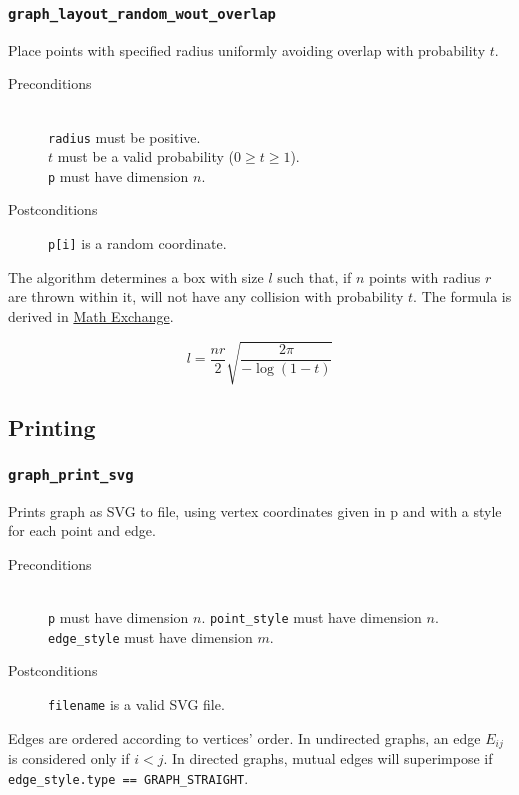 \documentclass[a4paper,10pt]{article}
\begin{document}
\subsubsection{\texttt{graph\_layout\_random\_wout\_overlap}}

Place points with specified radius uniformly avoiding overlap 
with probability $t$.

\begin{description}
 \item[Preconditions]~\\
   \texttt{radius} must be positive.\\
   $t$ must be a valid probability ($0 \ge t \ge 1$).\\
   \texttt{p} must have dimension $n$.
 \item[Postconditions] \texttt{p[i]} is a random coordinate.
\end{description}

The algorithm determines a box with size $l$ such that, if $n$ 
points with radius $r$ are thrown within it, will not have any 
collision with probability $t$. The formula is derived in 
\href{http://math.stackexchange.com/q/325844/37667}{Math Exchange}.

\begin{equation*}
 l = \frac{nr}{2} \sqrt{\frac{2 \pi}{-\log(1-t)}}
\end{equation*}

\subsection{Printing}

\subsubsection{\texttt{graph\_print\_svg}}

Prints graph as SVG to file, using vertex coordinates given in p and with a 
style for each point and edge.

\begin{description}
 \item[Preconditions]~\\
   \texttt{p} must have dimension $n$.
   \texttt{point\_style} must have dimension $n$.
   \texttt{edge\_style} must have dimension $m$.
 \item[Postconditions]
   \texttt{filename} is a valid SVG file.
\end{description}

Edges are ordered according to vertices' order. In undirected graphs, 
an edge $E_{ij}$ is considered only if $i < j$. In directed graphs,
mutual edges will superimpose if \texttt{edge\_style.type == GRAPH\_STRAIGHT}.
\end{document}
